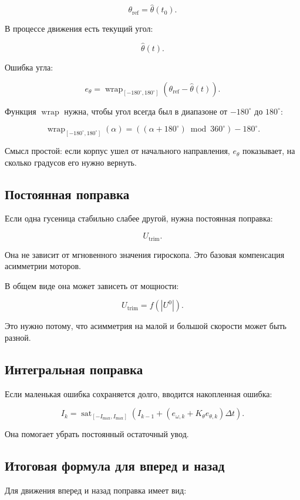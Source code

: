 \documentclass[12pt,a4paper]{article}
\newcommand{\thetahat}{\hat{\theta}}
\newcommand{\thetaref}{\theta_{\mathrm{ref}}}
\newcommand{\sat}{\operatorname{sat}}
\begin{document}
\[
\thetaref = \thetahat(t_0).
\]

В процессе движения есть текущий угол:

\[
\thetahat(t).
\]

Ошибка угла:

\[
e_\theta =
\operatorname{wrap}_{[-180^\circ,180^\circ]}
\left(\thetaref - \thetahat(t)\right).
\]

Функция \(\operatorname{wrap}\) нужна, чтобы угол всегда был в диапазоне
от \(-180^\circ\) до \(180^\circ\):

\[
\operatorname{wrap}_{[-180^\circ,180^\circ]}(\alpha)
=
\left((\alpha + 180^\circ) \bmod 360^\circ\right) - 180^\circ.
\]

Смысл простой: если корпус ушел от начального направления, \(e_\theta\)
показывает, на сколько градусов его нужно вернуть.

\subsection{Постоянная поправка}

Если одна гусеница стабильно слабее другой, нужна постоянная поправка:

\[
U_{\mathrm{trim}}.
\]

Она не зависит от мгновенного значения гироскопа. Это базовая компенсация
асимметрии моторов.

В общем виде она может зависеть от мощности:

\[
U_{\mathrm{trim}} = f(|U^0|).
\]

Это нужно потому, что асимметрия на малой и большой скорости может быть
разной.

\subsection{Интегральная поправка}

Если маленькая ошибка сохраняется долго, вводится накопленная ошибка:

\[
I_k =
\sat_{[-I_{\max},I_{\max}]}
\left(
I_{k-1} + \left(e_{\omega,k} + K_\theta e_{\theta,k}\right)\Delta t
\right).
\]

Она помогает убрать постоянный остаточный увод.

\subsection{Итоговая формула для вперед и назад}

Для движения вперед и назад поправка имеет вид:
\end{document}
